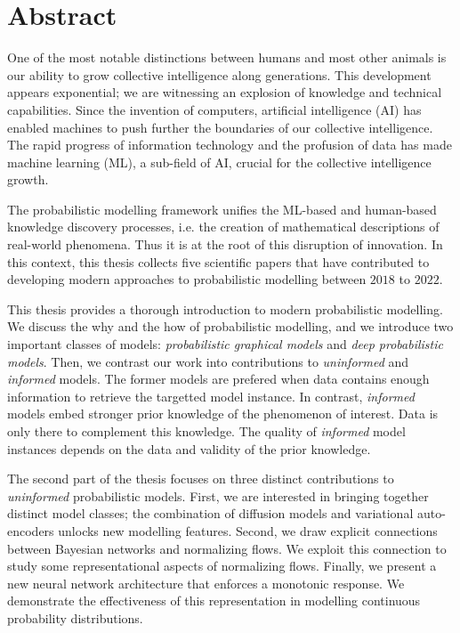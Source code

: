
\chapter*{Abstract}
One of the most notable distinctions between humans and most other animals is our ability to grow collective intelligence along generations. This development appears exponential; we are witnessing an explosion of knowledge and technical capabilities. Since the invention of computers, artificial intelligence (AI) has enabled machines to push further the boundaries of our collective intelligence.
The rapid progress of information technology and the profusion of data has made machine learning (ML), a sub-field of AI, crucial for the collective intelligence growth.

The probabilistic modelling framework unifies the ML-based and human-based knowledge discovery processes, i.e. the creation of mathematical descriptions of real-world phenomena. Thus it is at the root of this disruption of innovation. In this context, this thesis collects five scientific papers that have contributed to developing modern approaches to probabilistic modelling between $2018$ to $2022$.

This thesis provides a thorough introduction to modern probabilistic modelling. We discuss the why and the how of probabilistic modelling, and we introduce two important classes of models: \textit{probabilistic graphical models} and \textit{deep probabilistic models}. Then, we contrast our work into contributions to \textit{uninformed} and \textit{informed} models. The former models are prefered when data contains enough information to retrieve the targetted model instance. In contrast, \textit{informed} models embed stronger prior knowledge of the phenomenon of interest. Data is only there to complement this knowledge. The quality of \textit{informed} model instances depends on the data and validity of the prior knowledge.

The second part of the thesis focuses on three distinct contributions to \textit{uninformed} probabilistic models. First, we are interested in bringing together distinct model classes; the combination of diffusion models and variational auto-encoders unlocks new modelling features. Second, we draw explicit connections between Bayesian networks and normalizing flows. We exploit this connection to study some representational aspects of normalizing flows. Finally, we present a new neural network architecture that enforces a monotonic response. We demonstrate the effectiveness of this representation in modelling continuous probability distributions.

